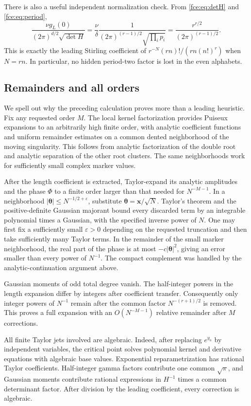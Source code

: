 \documentclass[11pt,a4paper]{article}
\numberwithin{equation}{section}
\theoremstyle{definition}\newtheorem{definition}[theorem]{Definition}
\theoremstyle{remark}\newtheorem{remark}[theorem]{Remark}
\begin{document}
There is also a useful independent normalization check. From
\eqref{fce:eq:detH} and \eqref{fce:eq:period},
\[
 \frac{\nu g_L(0)}{(2\pi)^{d/2}\sqrt{\det H}}
 =\frac{\nu}{\delta}\frac{1}{(2\pi)^{(r-1)/2}\sqrt{\prod_i p_i}}
 =\frac{r^{r/2}}{(2\pi)^{(r-1)/2}}.
\]
This is exactly the leading Stirling coefficient of
$r^{-N}(rn)!/(rn(n!)^r)$ when $N=rn$. In particular, no hidden period-two
factor is lost in the even alphabets.

\subsection{Remainders and all orders}\label{fce:subsec:allorders}
We spell out why the preceding calculation proves more than a leading
heuristic. Fix any requested order $M$. The local kernel factorization
provides Puiseux expansions to an arbitrarily high finite order,
with analytic coefficient functions and uniform remainder estimates on
a common dented neighborhood of the moving singularity. This follows
from analytic factorization of the double root and analytic separation
of the other root clusters. The same neighborhoods work for sufficiently
small complex marker values.

After the length coefficient is extracted, Taylor-expand its analytic
amplitudes and the phase $\Phi$ to a finite order larger than that needed
for $N^{-M-1}$. In a neighborhood
$|\boldsymbol\theta|\le N^{-1/2+\varepsilon}$, substitute
$\boldsymbol\theta=\boldsymbol x/\sqrt N$. Taylor's theorem and the
positive-definite Gaussian majorant bound every discarded term by an
integrable polynomial times a Gaussian, with the specified inverse power
of $N$. One may first fix a sufficiently small $\varepsilon>0$ depending
on the requested truncation and then take sufficiently many Taylor
terms. In the remainder of the small marker neighborhood, the real part
of the phase is at most $-c|\boldsymbol\theta|^2$, giving an error smaller
than every power of $N^{-1}$. The compact complement was handled by the
analytic-continuation argument above.

Gaussian moments of odd total degree vanish. The half-integer powers in
the length expansion differ by integers after coefficient transfer.
Consequently only integer powers of $N^{-1}$ remain after the common
factor $N^{-(r+1)/2}$ is removed. This proves a full expansion with an
$O(N^{-M-1})$ relative remainder after $M$ corrections.

All finite Taylor jets involved are algebraic. Indeed, after replacing
$e^{y_a}$ by independent variables, the critical point solves polynomial
kernel and derivative equations with algebraic base values. Exponential
reparametrization has rational Taylor coefficients. Half-integer gamma
factors contribute one common $\sqrt\pi$, and Gaussian moments contribute
rational expressions in $H^{-1}$ times a common determinant factor.
After division by the leading coefficient, every correction is algebraic.
\end{document}
